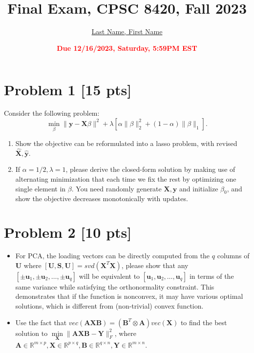 \documentclass[11pt]{article}
\title{{\bf Final Exam, CPSC 8420, Fall 2023}}
\author{\Large\underline{Last Name, First Name}}%
\date{\textbf{\Large\textcolor{red}{Due 12/16/2023, Saturday, 5:59PM EST}}}
\newcommand{\R}{\mathbb{R}}
\newcommand{\mtx}[1]{\mathbf{#1}}
\newcommand{\vct}[1]{\mathbf{#1}}
\def \mA {\mtx{A}}
\def \mB {\mtx{B}}
\def \mU {\mtx{U}}
\def \mS {\mtx{S}}
\def \mX {\mtx{X}}
\def \mY {\mtx{Y}}
\def \vu {\vct{u}}
\def \vy {\vct{y}}
\def \R {\mathbb{R}}
\begin{document}
\maketitle

\section*{Problem 1 [15 pts]}
Consider the following problem:
\begin{equation}
\min_{\beta} \|\vy-\mX\beta\|^2+\lambda[\alpha\|\beta\|^2_2+(1-\alpha)\|\beta\|_1].
\end{equation}
\begin{enumerate}
	\item Show the objective can be reformulated into a lasso problem, with revised $\hat{\mX}, \hat{\vy}$.
	\item If $\alpha=1/2,\lambda=1$, please derive the closed-form solution by making use of alternating minimization that each time we fix the rest by optimizing one single element in $\beta$. You need randomly generate $\mX, \vy$ and initialize  $\beta_0$, and show the objective decreases monotonically with updates.
\end{enumerate}

\newpage
\section*{Problem 2 [10 pts]}
\begin{itemize}
	\item For PCA, the loading vectors can be directly computed from the $q$ columns of  $\mU$ where  $[\mU,\mS,\mU]=svd(\mX^T\mX)$, please show that any $[\pm\vu_1,\pm\vu_2,\dots,\pm\vu_q]$ will be equivalent to $[\vu_1,\vu_2,\dots,\vu_q]$ in terms of the same variance while satisfying the orthonormality constraint. This demonstrates that if the function is nonconvex, it may have various optimal solutions, which is different from (non-trivial) convex function.
	\item Use the fact that $vec(\mA\mX\mB)=(\mB^T\otimes\mA)vec(\mX)$ to find the best solution to $\min\limits_{\mX} \|\mA\mX\mB-\mY\|_F^2$, where $\mA\in\R^{m\times p}, \mX\in\R^{p\times q}, \mB\in\R^{q\times n}, \mY\in\R^{m\times n}$.
\end{itemize}


\newpage
\end{document}
